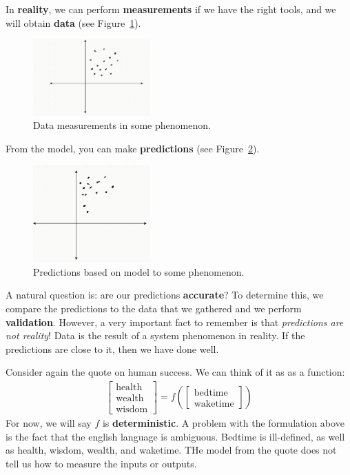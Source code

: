 \documentclass[12pt, a4paper]{article}
\theoremstyle{definition}
\begin{document}
	In \textbf{reality}, we can perform \textbf{measurements} if we have the right tools, and
	we will obtain \textbf{data} (see Figure~\ref{fig:data}).
	\begin{figure}
		\centering
		\includegraphics[width=0.4\textwidth]{data}
		\caption{Data measurements in some phenomenon.}
		\label{fig:data}
	\end{figure}
	From the model, you can make \textbf{predictions} (see Figure~\ref{fig:predictions}).
	\begin{figure}
		\centering
		\includegraphics[width=0.4\textwidth]{predictions}
		\caption{Predictions based on model to some phenomenon.}
		\label{fig:predictions}
	\end{figure}
	A natural question is: are our predictions \textbf{accurate}? To determine this, we compare
	the predictions to the data that we gathered and we perform \textbf{validation}.
	However, a very important fact to remember is that \textit{predictions are not reality}!
	Data is the result of a system phenomenon in reality. If the predictions are close to it,
	then we have done well.
	
	Consider again the quote on human success. We can think of it as as a function:
	\begin{align*}
		\begin{bmatrix}
			\text{health}\\
			\text{wealth}\\
			\text{wisdom}
		\end{bmatrix}
		=
		f\left(\begin{bmatrix}
			\text{bedtime}\\
			\text{waketime}
		\end{bmatrix}\right)
	\end{align*}
	For now, we will say $f$ is \textbf{deterministic}. A problem with the formulation above
	is the fact that the english language is ambiguous. Bedtime is ill-defined, as well as
	health, wisdom, wealth, and waketime. THe model from the quote does not tell us how to measure
	the inputs or outputs.
	
\end{document}
